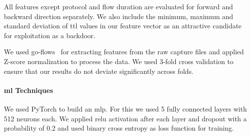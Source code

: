 \documentclass[10pt,sigconf,letterpaper,dvipsnames]{acmart}
\begin{document}
All features except protocol and flow duration are evaluated for forward and backward direction separately.
We also include the minimum, maximum and standard deviation of \gls{ttl} values in our feature vector as an attractive candidate for exploitation as a backdoor. %

We used go-flows~\cite{vormayr_go-flows_2019}
for extracting features from the raw capture files and applied Z-score normalization to process the data. We used 3-fold cross validation to ensure that our results do not deviate significantly across folds.


\paragraph{\gls{ml} Techniques}
We used PyTorch to build an \gls{mlp}. 
For this we used 5 fully connected layers with 512 neurons each. We applied \gls{relu} activation after each layer and dropout with a probability of 0.2 and used binary cross entropy  as loss function for training. %
\end{document}
